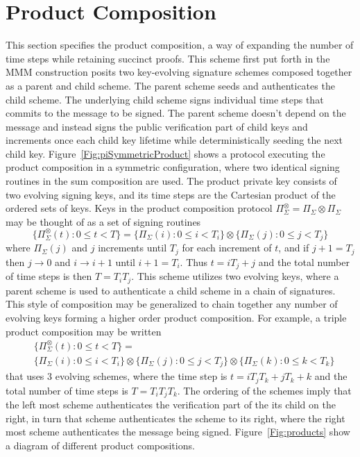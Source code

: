 \documentclass{article}
\begin{document}
\section{Product Composition}
This section specifies the product composition, a way of expanding the number of time steps while retaining succinct proofs.  
This scheme first put forth in the MMM construction  posits two key-evolving signature schemes composed together as a parent and child scheme.  The parent scheme seeds and authenticates the child scheme.
The underlying child scheme signs individual time steps that commits to the message to be signed. 
The parent scheme doesn't depend on the message and instead signs the public verification part of child keys and increments once each child key lifetime while deterministically seeding the next child key. 
Figure~\ref{Fig:piSymmetricProduct} shows a protocol executing the product composition in a symmetric configuration, where two identical signing routines in the sum composition are used.
The product private key consists of two evolving signing keys, and its time steps are the Cartesian product of the ordered sets of keys.  
Keys in the product composition protocol $\Pi_\Sigma^\otimes = \Pi_\Sigma \otimes \Pi_\Sigma$ may be thought of as a set of signing routines 
\begin{equation}
    \{\Pi_\Sigma^\otimes(t):0\leq t < T\} = \{\Pi_\Sigma(i):0\leq i < T_i\}\otimes \{\Pi_\Sigma(j):0\leq j <T_j\}
\end{equation}
where $\Pi_\Sigma(j)$ and $j$ increments until $T_j$ for each increment of $t$, and if $j+1 = T_j$ then $j \to 0 $ and $i\to i+1$ until $i+1 = T_i$.  Thus $t = iT_j + j$  and the total number of time steps is then $T = T_i T_j$. 
This scheme utilizes two evolving keys, where a parent scheme is used to authenticate a child scheme in a chain of signatures.  This style of composition may be generalized to chain together any number of evolving keys forming a higher order product composition.  For example, a triple product composition may be written
\begin{equation}
\begin{split}
    &\{\Pi_\Sigma^\otimes(t):0\leq t < T\} = \\
    &\{\Pi_\Sigma(i):0\leq i < T_i\} \otimes \{\Pi_\Sigma(j):0\leq j <T_j\} \otimes \{\Pi_\Sigma(k):0\leq k <T_k\}
\end{split}
\end{equation}
that uses 3 evolving schemes, where the time step is $t= i T_j T_k+j T_k + k$ and the total number of time steps is $T= T_i T_j T_k$.  
The ordering of the schemes imply that the left most scheme authenticates the verification part of the its child on the right, in turn that scheme authenticates the scheme to its right, where the right most scheme authenticates the message being signed.  Figure~\ref{Fig:products} show a diagram of different product compositions.
\end{document}
